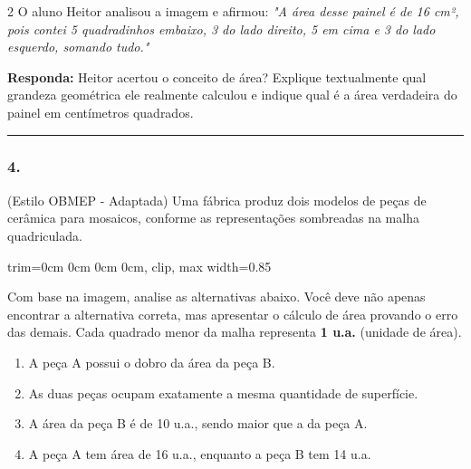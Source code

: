 \documentclass[twoside, 10pt, a4paper]{article}
\newlength{\espacoPreQuestao}\setlength{\espacoPreQuestao}{0.1cm}
\newlength{\espacoQuestao}\setlength{\espacoQuestao}{0.2cm}
\newlength{\espacoAlt}\setlength{\espacoAlt}{0.2cm}
\begin{document}
\begin{multicols*}{2}
O aluno Heitor analisou a imagem e afirmou: \textit{"A área desse painel é de 16 cm², pois contei 5 quadradinhos embaixo, 3 do lado direito, 5 em cima e 3 do lado esquerdo, somando tudo."}
\begin{boxresponda}
\textbf{Responda:} Heitor acertou o conceito de área? Explique textualmente qual grandeza geométrica ele realmente calculou e indique qual é a área verdadeira do painel em centímetros quadrados.
\end{boxresponda}
\par\vspace{\espacoQuestao}

\noindent\textcolor{CorLinha}{\rule{\linewidth}{0.5pt}} 
\par\vspace{\espacoPreQuestao}
\subsubsection*{4.} (Estilo OBMEP - Adaptada) Uma fábrica produz dois modelos de peças de cerâmica para mosaicos, conforme as representações sombreadas na malha quadriculada.

\begin{center}
\begin{adjustbox}{trim=0cm 0cm 0cm 0cm, clip, max width=0.85\linewidth}
\end{adjustbox}
\end{center}

Com base na imagem, analise as alternativas abaixo. Você deve não apenas encontrar a alternativa correta, mas apresentar o cálculo de área provando o erro das demais. Cada quadrado menor da malha representa \textbf{1 u.a.} (unidade de área).
\begin{enumerate}[label=\alph*), itemsep=\espacoAlt]
    \item A peça A possui o dobro da área da peça B.
    \item As duas peças ocupam exatamente a mesma quantidade de superfície.
    \item A área da peça B é de 10 u.a., sendo maior que a da peça A.
    \item A peça A tem área de 16 u.a., enquanto a peça B tem 14 u.a.
\end{enumerate}
\par\vspace{\espacoQuestao}


\end{multicols*}
\end{document}
